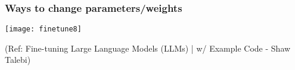 


\begin{frame}[fragile]\frametitle{Ways to change parameters/weights}


		\begin{center}
		\texttt{[image: finetune8]}
		\end{center}

{\tiny (Ref: Fine-tuning Large Language Models (LLMs) | w/ Example Code - Shaw Talebi)}

\end{frame}





